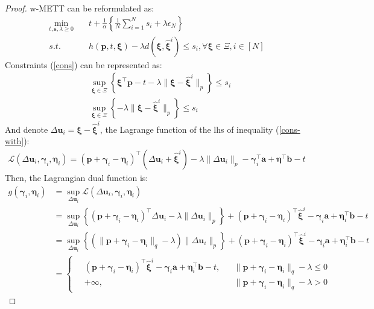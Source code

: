 \documentclass{article}
\begin{document}
\begin{proof}
	w-METT can be reformulated as:
	\begin{align}
		\min_{t, \bm{s}, \lambda \geq 0 } \quad & t + \frac{1}{\alpha} \left\{\frac{1}{N} \sum_{i=1}^{N} s_i + \lambda \epsilon_N\right\}  \\
		s.t. \quad & h(\bm{p}, t, \bm{\xi}) - \lambda d(\bm{\xi}, \hat{\bm{\xi}}^i) \leq s_i, \forall \bm{\xi} \in \Xi, i \in [N] \label{cons}
	\end{align}
	Constraints (\ref{cons}) can be represented as:
	\begin{align}
		& \sup_{\bm{\xi} \in \Xi} \left\{\bm{\xi}^\top \bm{p} - t - \lambda \|\bm{\xi} - \hat{\bm{\xi}}^i \|_p\right\} \leq s_i \label{cons-with}\\
		& \sup_{\bm{\xi} \in \Xi} \left\{-\lambda \|\bm{\xi} - \hat{\bm{\xi}}^i \|_p\right\} \leq s_i
	\end{align}
	And denote $\Delta \bm{u}_i = \bm{\xi} - \hat{\bm{\xi}}^i$,  the Lagrange function of the lhs of inequality (\ref{cons-with}):
	\begin{align}
		\mathcal{L}(\Delta \bm{u}_i, \bm{\gamma}_i, \bm{\eta}_i) = (\bm{p} + \bm{\gamma}_i - \bm{\eta}_i)^\top (\Delta \bm{u}_i + \hat{\bm{\xi}}^i) - \lambda \|\Delta \bm{u}_i\|_p - \bm{\gamma}_i^\top \bm{a} + \bm{\eta}^\top \bm{b} - t
	\end{align}
	Then, the Lagrangian dual function is:
	\begin{align}
		g(\bm{\gamma}_i, \bm{\eta}_i) & = \sup_{\Delta \bm{u}_i} \mathcal{L}(\Delta \bm{u}_i, \bm{\gamma}_i, \bm{\eta}_i) \\
		& = \sup_{\Delta \bm{u}_i} \left\{(\bm{p} + \bm{\gamma}_i - \bm{\eta}_i)^\top \Delta \bm{u}_i - \lambda \|\Delta \bm{u}_i\|_p\right\}  + (\bm{p} + \bm{\gamma}_i - \bm{\eta}_i)^\top\hat{\bm{\xi}}^i - \bm{\gamma}_i\bm{a} + \bm{\eta}_i^\top \bm{b} - t \\
		& = \sup_{\Delta \bm{u}_i} \left\{ (\|\bm{p} + \bm{\gamma}_i - \bm{\eta}_i\|_q - \lambda) \|\Delta \bm{u}_i\|_p \right\} + (\bm{p} + \bm{\gamma}_i - \bm{\eta}_i)^\top\hat{\bm{\xi}}^i - \bm{\gamma}_i\bm{a} + \bm{\eta}_i^\top \bm{b} - t \\
		& = \left\{
		\begin{aligned}
			\ &  (\bm{p} + \bm{\gamma}_i - \bm{\eta}_i)^\top\hat{\bm{\xi}}^i - \bm{\gamma}_i\bm{a} + \bm{\eta}_i^\top \bm{b} - t, && \|\bm{p} + \bm{\gamma}_i - \bm{\eta}_i\|_q - \lambda \leq 0 \\
			& + \infty, && \|\bm{p} + \bm{\gamma}_i - \bm{\eta}_i\|_q - \lambda > 0

\end{aligned}
\end{align}
\end{proof}
\end{document}
